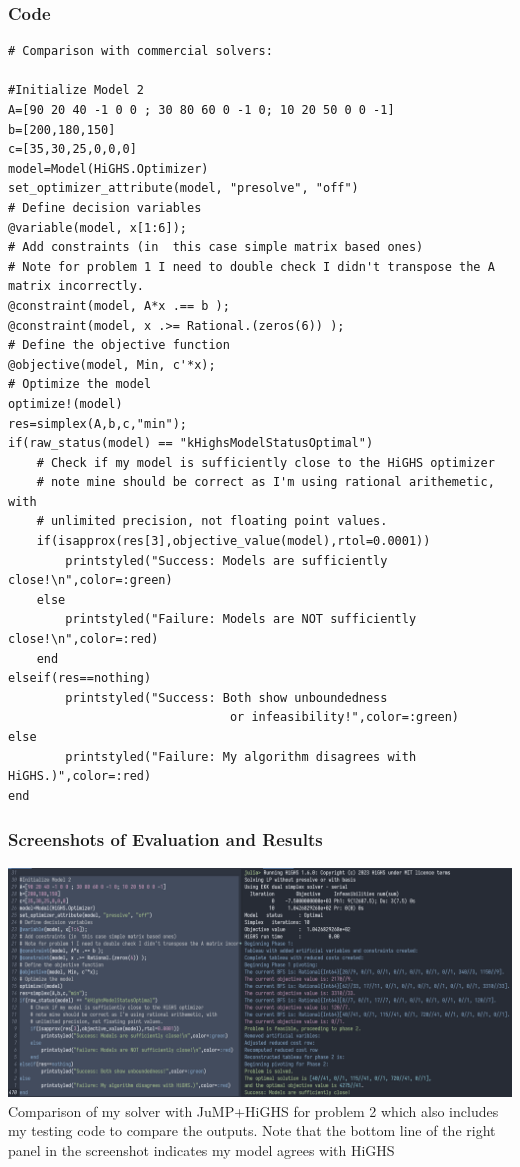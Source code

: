 \documentclass[11pt]{article}
\begin{document}
\subsubsection{Code}
\label{sec:org50415e9}
\begin{verbatim}
# Comparison with commercial solvers:

#Initialize Model 2
A=[90 20 40 -1 0 0 ; 30 80 60 0 -1 0; 10 20 50 0 0 -1]
b=[200,180,150]
c=[35,30,25,0,0,0]
model=Model(HiGHS.Optimizer)
set_optimizer_attribute(model, "presolve", "off")
# Define decision variables
@variable(model, x[1:6]);
# Add constraints (in  this case simple matrix based ones)
# Note for problem 1 I need to double check I didn't transpose the A matrix incorrectly.
@constraint(model, A*x .== b );
@constraint(model, x .>= Rational.(zeros(6)) );
# Define the objective function
@objective(model, Min, c'*x);
# Optimize the model
optimize!(model)
res=simplex(A,b,c,"min");
if(raw_status(model) == "kHighsModelStatusOptimal")
    # Check if my model is sufficiently close to the HiGHS optimizer
    # note mine should be correct as I'm using rational arithemetic, with
    # unlimited precision, not floating point values.
    if(isapprox(res[3],objective_value(model),rtol=0.0001))
        printstyled("Success: Models are sufficiently close!\n",color=:green)
    else
        printstyled("Failure: Models are NOT sufficiently close!\n",color=:red)
    end
elseif(res==nothing)
        printstyled("Success: Both show unboundedness
                               or infeasibility!",color=:green)
else
        printstyled("Failure: My algorithm disagrees with HiGHS.)",color=:red)
end

\end{verbatim}

\subsubsection{Screenshots of Evaluation and Results}
\label{sec:orga6cab65}

\begin{center}
\includegraphics[width=1\textwidth]{figure8.png}\\
Comparison of my solver with JuMP+HiGHS for problem 2 which also includes my testing code to compare the outputs. Note that the bottom line of the right panel in the screenshot indicates my model agrees with HiGHS\\
\end{center}
\end{document}
